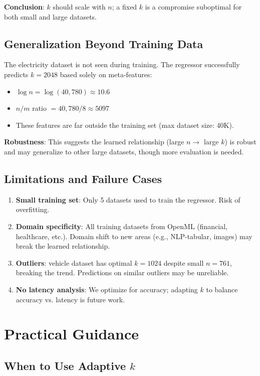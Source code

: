 \documentclass[11pt,a4paper]{article}
\begin{document}
\textbf{Conclusion}: $k$ should scale with $n$; a fixed $k$ is a compromise suboptimal for both small and large datasets.

\subsection{Generalization Beyond Training Data}

The electricity dataset is not seen during training. The regressor successfully predicts $k=2048$ based solely on meta-features:
\begin{itemize}
\item $\log n = \log(40,780) \approx 10.6$
\item $n/m$ ratio $= 40,780 / 8 \approx 5097$
\item These features are far outside the training set (max dataset size: 40K).
\end{itemize}

\textbf{Robustness}: This suggests the learned relationship (large $n \to$ large $k$) is robust and may generalize to other large datasets, though more evaluation is needed.

\subsection{Limitations and Failure Cases}

\begin{enumerate}
\item \textbf{Small training set}: Only 5 datasets used to train the regressor. Risk of overfitting.
\item \textbf{Domain specificity}: All training datasets from OpenML (financial, healthcare, etc.). Domain shift to new areas (e.g., NLP-tabular, images) may break the learned relationship.
\item \textbf{Outliers}: vehicle dataset has optimal $k=1024$ despite small $n=761$, breaking the trend. Predictions on similar outliers may be unreliable.
\item \textbf{No latency analysis}: We optimize for accuracy; adapting $k$ to balance accuracy vs. latency is future work.
\end{enumerate}

\section{Practical Guidance}

\subsection{When to Use Adaptive $k$}
\end{document}
